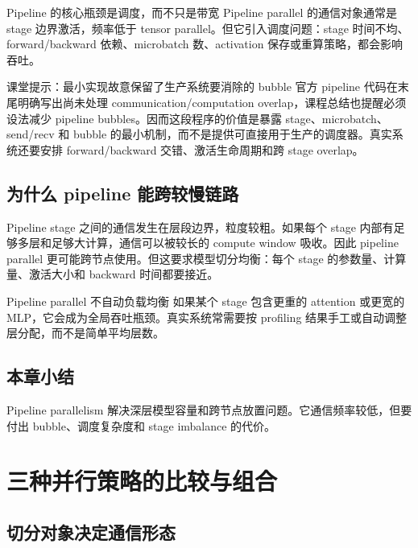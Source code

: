\documentclass[a4paper]{article}
\begin{document}
\begin{importantbox}{Pipeline 的核心瓶颈是调度，而不只是带宽}
Pipeline parallel 的通信对象通常是 stage 边界激活，频率低于 tensor parallel。但它引入调度问题：stage 时间不均、forward/backward 依赖、microbatch 数、activation 保存或重算策略，都会影响吞吐。
\end{importantbox}

\begin{knowledgebox}{课堂提示：最小实现故意保留了生产系统要消除的 bubble}
官方 pipeline 代码在末尾明确写出尚未处理 communication/computation overlap，课程总结也提醒必须设法减少 pipeline bubbles。因而这段程序的价值是暴露 stage、microbatch、send/recv 和 bubble 的最小机制，而不是提供可直接用于生产的调度器。真实系统还要安排 forward/backward 交错、激活生命周期和跨 stage overlap。
\end{knowledgebox}

\subsection{为什么 pipeline 能跨较慢链路}

Pipeline stage 之间的通信发生在层段边界，粒度较粗。如果每个 stage 内部有足够多层和足够大计算，通信可以被较长的 compute window 吸收。因此 pipeline parallel 更可能跨节点使用。但这要求模型切分均衡：每个 stage 的参数量、计算量、激活大小和 backward 时间都要接近。

\begin{warningbox}{Pipeline parallel 不自动负载均衡}
如果某个 stage 包含更重的 attention 或更宽的 MLP，它会成为全局吞吐瓶颈。真实系统常需要按 profiling 结果手工或自动调整层分配，而不是简单平均层数。
\end{warningbox}

\subsection{本章小结}

Pipeline parallelism 解决深层模型容量和跨节点放置问题。它通信频率较低，但要付出 bubble、调度复杂度和 stage imbalance 的代价。

\section{三种并行策略的比较与组合}

\subsection{切分对象决定通信形态}
\end{document}

